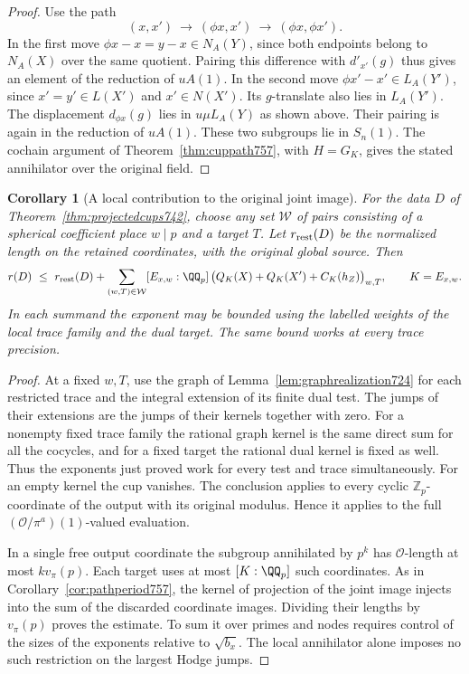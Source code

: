 \documentclass[a4paper,11pt]{article}
\newtheorem{corollary}[proposition]{Corollary}
\theoremstyle{definition}
\theoremstyle{remark}
\newcommand{\ZZ}{\mathbb Z}\newcommand{\ord}{\operatorname{ord}}
\numberwithin{equation}{section}
\begin{document}
\begin{proof}
Use the path
\[
       (x,x')\ \longrightarrow\ (\phi x,x')
                    \ \longrightarrow\ (\phi x,\phi x').
\]
In the first move \(\phi x-x=y-x\in N_A(Y)\), since both
endpoints belong to \(N_A(X)\) over the same quotient.
Pairing this difference with \(d'_{x'}(g)\) thus gives an
element of the reduction of \(uA(1)\). In the second move
\(\phi x'-x'\in L_A(Y')\), since \(x'=y'\in L(X')\)
and \(x'\in N(X')\). Its \(g\)-translate also lies in
\(L_A(Y')\). The displacement \(d_{\phi x}(g)\) lies in
\(u\mu L_A(Y)\) as shown above. Their pairing is again in
the reduction of \(uA(1)\). These two subgroups lie in
\(S_n(1)\). The cochain argument of
Theorem~\ref{thm:cuppath757}, with \(H=G_K\), gives the
stated annihilator over the original field.
\end{proof}

\begin{corollary}[A local contribution to the original joint image]
\leavevmode\label{cor:sphericalcupbound762}
For the data \(D\) of Theorem~\ref{thm:projectedcups742},
choose any set \(\mathcal W\) of pairs consisting of a
spherical coefficient place \(w\mid p\) and a target \(T\).
Let \(r_{\rm rest}(D)\) be the normalized length on the
retained coordinates, with the original global source.
Then
\[
 r(D)\ \le\ r_{\rm rest}(D)+
      \sum_{(w,T)\in\mathcal W}
          [E_{x,w}:\QQ_p]\,
           \bigl(Q_K(X)+Q_K(X')+C_K(h_Z)\bigr)_{w,T},
       \qquad K=E_{x,w}.
\]
In each summand the exponent may be bounded using the
labelled weights of the local trace family and the dual
target. The same bound works at every trace precision.
\end{corollary}
\begin{proof}
At a fixed \(w,T\), use the graph of
Lemma~\ref{lem:graphrealization724} for each restricted trace
and the integral extension of its finite dual test.
The jumps of their extensions are the jumps of their
kernels together with zero. For a nonempty fixed trace
family the rational graph kernel is the same direct sum
for all the cocycles, and for a fixed target the rational
dual kernel is fixed as well. Thus the exponents just
proved work for every test and trace simultaneously. For
an empty kernel the cup vanishes. The conclusion applies
to every cyclic \(\ZZ_p\)-coordinate of the output with
its original modulus. Hence it applies to the full
\((\mathcal O/\pi^a)(1)\)-valued evaluation.

In a single free output coordinate the subgroup annihilated
by \(p^k\) has \(\mathcal O\)-length at most
\(k v_\pi(p)\). Each target uses at most \([K:\QQ_p]\)
such coordinates. As in Corollary~\ref{cor:pathperiod757},
the kernel of projection of the joint image injects into
the sum of the discarded coordinate images. Dividing their
lengths by \(v_\pi(p)\) proves the estimate. To sum it
over primes and nodes requires control of the sizes of
the exponents relative to \(\sqrt{b_x}\). The local
annihilator alone imposes no such restriction on the
largest Hodge jumps.
\end{proof}
\clearpage
\end{document}
